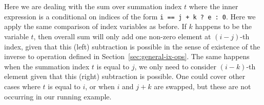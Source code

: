 \begin{code}
\AgdaSpace{}%
\AgdaSymbol{\AgdaUnderscore{}}\AgdaSpace{}%
%
\>[16]\AgdaSymbol{|}\AgdaSpace{}%
%
\>[28]\AgdaSymbol{|}\AgdaSpace{}%
\AgdaSpace{}%
\AgdaSymbol{\AgdaUnderscore{}}\AgdaSpace{}%
%
\>[40]\AgdaSymbol{=}\AgdaSpace{}%
%
\>[53]\AgdaSymbol{(}\AgdaSpace{}%
\AgdaSymbol{)}\AgdaSpace{}%
\AgdaSymbol{(}\AgdaSpace{}%
\AgdaSymbol{)}\AgdaSpace{}%
\AgdaSpace{}%
\AgdaSpace{}%
\<%
\\
\>[0]\AgdaSpace{}%
\AgdaCatchallClause{\AgdaSymbol{|}}\AgdaSpace{}%
\AgdaCatchallClause{\AgdaSymbol{\AgdaUnderscore{}}}%
\>[16]\AgdaCatchallClause{\AgdaSymbol{|}}\AgdaSpace{}%
\AgdaCatchallClause{\AgdaSymbol{\AgdaUnderscore{}}}%
\>[28]\AgdaCatchallClause{\AgdaSymbol{|}}\AgdaSpace{}%
\AgdaCatchallClause{\AgdaSymbol{\AgdaUnderscore{}}}%
\>[40]\AgdaSymbol{=}\AgdaSpace{}%
\AgdaSpace{}%
\AgdaSymbol{(}\AgdaSpace{}%
\AgdaSymbol{(}\AgdaSpace{}%
\AgdaSymbol{)}\AgdaSpace{}%
\AgdaSymbol{(}\AgdaSpace{}%
\AgdaSymbol{(}\AgdaSpace{}%
\AgdaSymbol{)}\AgdaSpace{}%
\AgdaSymbol{(}\AgdaSpace{}%
\AgdaSymbol{)}\AgdaSpace{}%
\AgdaSpace{}%
\AgdaSymbol{)}\AgdaSpace{}%
\AgdaSymbol{)}\<%
\\
\>[0]\<%
\end{code}
\begin{code}[hide]%
\>[0]\AgdaSpace{}%
\AgdaCatchallClause{\AgdaSymbol{(}}\AgdaSpace{}%
\AgdaCatchallClause{\AgdaSymbol{)}}\AgdaSpace{}%
\AgdaCatchallClause{\AgdaSymbol{|}}\AgdaSpace{}%
\AgdaSpace{}%
\AgdaSymbol{=}\AgdaSpace{}%
\AgdaSpace{}%
\<%
\end{code}
Here we are dealing with the sum over summation index $t$ where the inner expression is
a conditional on indices of the form \texttt{i == j + k ? e : 0}.  Here we apply the
same comparison of index variables as before.  If $k$ happens to be the variable $t$,
then overall sum will only add one non-zero element at $(i-j)$-th index, given that this
(left) subtraction is possible in the sense of existence of the inverse to  operation
defined in Section~\ref{sec:general-ix-ops}.  The same happens when the summation index
$t$ is equal to $j$, we only need to consider $(i-k)$-th element given that this (right)
subtraction is possible.  One could cover other cases where $t$ is equal to $i$, or
when $i$ and $j+k$ are swapped, but these are not occurring in our running example.

